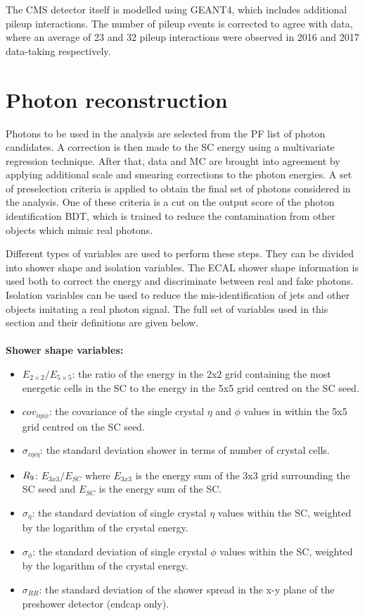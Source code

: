 The CMS detector itself is modelled using \textsc{GEANT4}, 
which includes additional pileup interactions.
The number of pileup events is corrected to agree with data, 
where an average of 23 and 32 pileup interactions were observed in 2016 and 2017 data-taking respectively.

\section{Photon reconstruction}

Photons to be used in the \Hgg analysis are selected from the PF list of photon candidates.
A correction is then made to the SC energy using a multivariate regression technique.
After that, data and MC are brought into agreement by applying additional scale and smearing corrections to the photon energies.
A set of preselection criteria is applied to obtain the final set of photons considered in the analysis.
One of these criteria is a cut on the output score of the photon identification BDT, 
which is trained to reduce the contamination from other objects which mimic real photons.

Different types of variables are used to perform these steps.
They can be divided into shower shape and isolation variables.
The ECAL shower shape information is used both to correct the energy and discriminate between real and fake photons.
Isolation variables can be used to reduce the mis-identification of jets and other objects imitating a real photon signal.
The full set of variables used in this section and their definitions are given below.
\\ \\
\textbf{Shower shape variables:}
\begin{itemize}[noitemsep]
  \item \emph{$E_{2\times2}/E_{5\times5}$}: the ratio of the energy in the 2x2 grid
    containing the most energetic cells in the SC to the energy in
    the 5x5 grid centred on the SC seed.
  \item \emph{$cov_{i\eta i\phi}$}: the covariance of the single crystal $\eta$
    and $\phi$ values in within the 5x5 grid centred on the
    SC seed.
  \item \emph{$\sigma_{i\eta i\eta}$}: the standard deviation 
    shower in terms of number of crystal cells. 
  \item \emph{$R_9$}: $E_{3x3}/E_{SC}$ where $E_{3x3}$ is the energy sum of the
    3x3 grid surrounding the SC seed and $E_{SC}$ is the energy sum of the SC. 
  \item \emph{$\sigma_{\eta}$}: the standard deviation
    of single crystal $\eta$ values within the SC, weighted by the logarithm of the crystal energy.
  \item \emph{$\sigma_{\phi}$}: the standard deviation
    of single crystal $\phi$ values within the SC, weighted by the logarithm of the crystal energy.
  \item \emph{$\sigma_{RR}$}: the standard deviation of the shower
    spread in the x-y plane of the preshower detector (endcap only).
\end{itemize}

